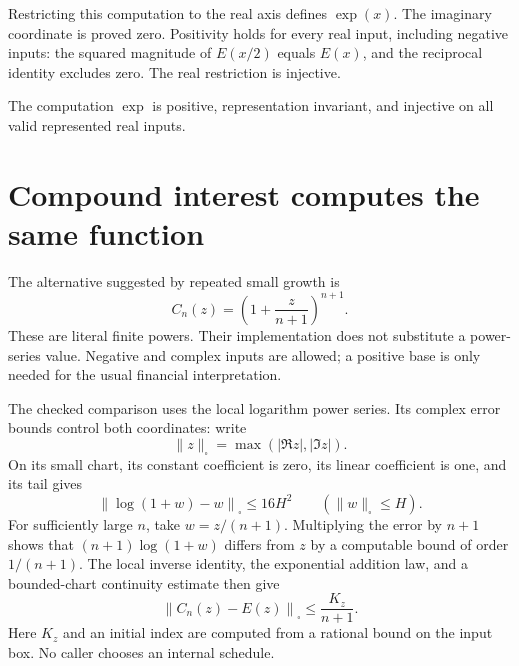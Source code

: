 \leanok

Restricting this computation to the real axis defines $\exp(x)$. The imaginary
coordinate is proved zero. Positivity holds for every real input, including
negative inputs: the squared magnitude of $E(x/2)$ equals $E(x)$, and the
reciprocal identity excludes zero. The real restriction is injective.

\begin{theorem}\label{thm:represented-real-exponential}
\leanok
The computation $\exp$ is positive, representation invariant, and injective
on all valid represented real inputs.
\end{theorem}

\section{Compound interest computes the same function}\label{sec:compound-exponential}

The alternative suggested by repeated small growth is
\[
 C_n(z)=\left(1+\frac{z}{n+1}\right)^{n+1}.
\]
These are literal finite powers. Their implementation does not substitute a
power-series value. Negative and complex inputs are allowed; a positive base
is only needed for the usual financial interpretation.

The checked comparison uses the local logarithm power series. Its complex
error bounds control both coordinates: write
\[
 \|z\|_{\square}=\max(|\Re z|,|\Im z|).
\]
On its small chart, its constant coefficient is zero, its linear coefficient is one, and
its tail gives
\[
 \left\|\log(1+w)-w\right\|_{\square}\leq 16H^2\qquad
 (\|w\|_{\square}\leq H).
\]
For sufficiently large $n$, take $w=z/(n+1)$. Multiplying the error by
$n+1$ shows that $(n+1)\log(1+w)$ differs from $z$ by a computable bound of
order $1/(n+1)$. The local inverse identity, the exponential addition law,
and a bounded-chart continuity estimate then give
\[
 \left\|C_n(z)-E(z)\right\|_{\square}\leq \frac{K_z}{n+1}.
\]
Here $K_z$ and an initial index are computed from a rational bound on the
input box. No caller chooses an internal schedule.

